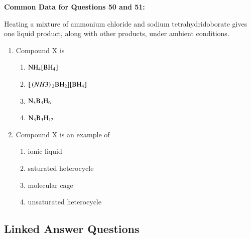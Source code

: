 \documentclass[journal,12pt,onecolumn]{IEEEtran}
\theoremstyle{remark}
\begin{document}
\textbf{Common Data for Questions 50 and 51:}

Heating a mixture of ammonium chloride and sodium tetrahydridoborate gives one liquid product, along with other products, under ambient conditions.

\begin{enumerate}[resume]
\item Compound X is
    \begin{enumerate}
        \item $\ce{NH4[BH4]}$
        \item $\ce{[\brak{NH3}2BH2][BH4]}$
        \item $\ce{N3B3H6}$
        \item $\ce{N3B3H12}$
    \end{enumerate}
    \hfill{}

\item Compound X is an example of
    \begin{enumerate}
        \item ionic liquid
        \item saturated heterocycle
        \item molecular cage
        \item unsaturated heterocycle
    \end{enumerate}
    \hfill{}
\end{enumerate}

\subsection*{Linked Answer Questions}
\end{document}
